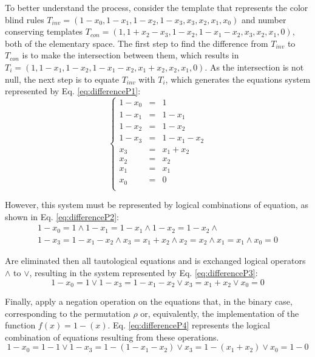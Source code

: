 \documentclass[12pt, a4paper]{article}
\begin{document}
To better understand the process, consider the template that represents the color blind rules $T_{inv} = (1 - x_0, 1 - x_1, 1 - x_2, 1 - x_3, x_3, x_2, x_1, x_0)$ and number conserving templates $T_{con} = (1, 1 + x_2 - x_3, 1 - x_2, 1 - x_1 - x_2, x_3, x_2, x_1, 0)$, both of the elementary space. The first step to find the difference from $T_{inv}$ to $T_{con}$ is to make the intersection between them, which results in $T_i = (1, 1 - x_1, 1 - x_2, 1 - x_1 - x_2, x_1 + x_2, x_2, x_1, 0)$. As the intersection is not null, the next step is to equate $T_{inv}$ with $T_i$, which generates the equations system represented by Eq. \ref{eq:differenceP1}: \begin{equation} \left\{\begin{matrix} 1 - x_0	& = &	1				\\ 1 - x_1	& = &	1 - x_1			\\ 1 - x_2	& = &	1 - x_2			\\ 1 - x_3	& = &	1 - x_1 - x_2	\\
x_3		& = &	x_1 + x_2		\\
x_2		& = &	x_2				\\
x_1		& = &	x_1				\\
x_0		& = &	0				\\
\end{matrix}\right.
\label{eq:differenceP1}
\end{equation}

However, this system must be represented by logical combinations of equation, as shown in Eq. \ref{eq:differenceP2}:
\begin{equation}
\begin{split}
1 - x_0	= 1				\wedge
1 - x_1	= 1 - x_1		\wedge
1 - x_2	= 1 - x_2		\wedge\\
1 - x_3	= 1 - x_1 - x_2	\wedge 
x_3		= x_1 + x_2		\wedge
x_2		= x_2			\wedge
x_1		= x_1			\wedge
x_0		= 0				
\label{eq:differenceP2}
\end{split}
\end{equation}

Are eliminated then all tautological equations and is exchanged logical operators $\wedge$ to $\vee$, resulting in the system represented by Eq. \ref{eq:differenceP3}:
\begin{equation}
1 - x_0	= 1				\vee 
1 - x_3	= 1 - x_1 - x_2	\vee
x_3		= x_1 + x_2		\vee 
x_0		= 0				
\label{eq:differenceP3}
\end{equation}

Finally, apply a negation operation on the equations that, in the binary case, corresponding to the permutation $\rho $ or, equivalently, the implementation of the function $f(x) = 1 - (x)$. Eq. \eqref{eq:differenceP4} represents the logical combination of equations resulting from these operations.
\begin{equation}
1 - x_0	= 1 - 1					\vee 
1 - x_3	= 1 - (1 - x_1 - x_2)	\vee
x_3		= 1 - (x_1 + x_2)		\vee 
x_0		= 1 - 0				
\label{eq:differenceP4}
\end{equation}
\end{document}

